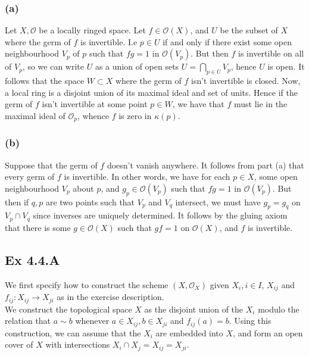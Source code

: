 \documentclass{article}
\theoremstyle{definition}
\newcommand{\oo}{\mathcal{O}}
\begin{document}
\subsubsection*{(a)}

Let $X, \oo$ be a locally ringed space. Let $f \in \oo(X)$, and $U$ be the
subset of $X$ where the germ of $f$ is invertible. I.e $p \in U$ if and only if
there exist some open neighbourhood $V_p$ of $p$ such that $fg = 1$ in
$\oo(V_p)$. But then $f$ is invertible on all of $V_p$, so we can write $U$ as
a union of open sets $U = \bigcap_{p \in U} V_p$, hence $U$ is open. It follows
that the space $W \subset X$ where the germ of $f$ isn't invertible is closed.
Now, a local ring is a disjoint union of its maximal ideal and set of units.
Hence if the germ of $f$ isn't invertible at some point $p \in W$, we have that
$f$ must lie in the maximal ideal of $\mathcal{O}_p$, whence $f$ is zero in
$\kappa(p)$.

\subsubsection*{(b)}

Suppose that the germ of $f$ doesn't vanish anywhere. It follows from part (a)
that every germ of $f$ is invertible. In other words, we have for each $p \in
X$, some open neighbourhood $V_p$ about $p$, and $g_p \in \oo(V_p)$ such that
$fg = 1$ in $\oo(V_p)$. But then if $q, p$ are two points such that $V_p$ and
$V_q$ intersect, we must have $g_p = g_q$ on $V_p \cap V_q$ since inverses are
uniquely determined. It follows by the gluing axiom that there is some $g \in
\oo(X)$ such that $gf = 1$ on $\oo(X)$, and $f$ is invertible.

\subsection*{Ex 4.4.A}


We first specify how to construct the scheme $(X, \mathcal{O}_X)$ given $X_i, i
\in I$, $X_{ij}$ and $f_{ij} : X_{ij} \to X_{ji}$ as in the exercise
description. \\

We construct the topological space $X$ as the disjoint union of the $X_i$
modulo the relation that $a \sim b$ whenever $a \in X_{ij}, b \in X_{ji}$ and
$f_{ij}(a) = b$. Using this construction, we can assume that the $X_i$ are
embedded into $X$, and form an open cover of $X$ with intersections $X_i \cap
X_j = X_{ij} = X_{ji}$. \\
\end{document}
